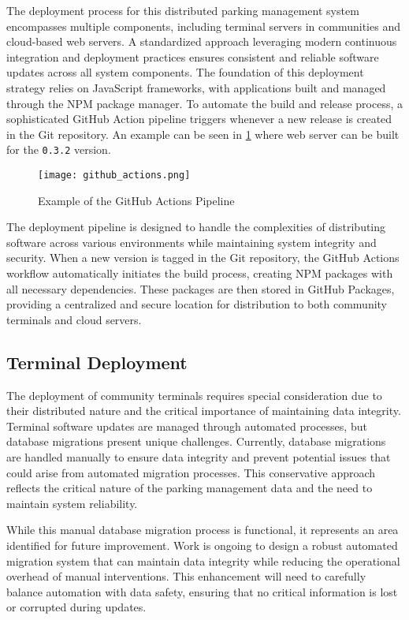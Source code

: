 The deployment process for this distributed parking management system encompasses multiple components, including terminal servers in communities and cloud-based web servers. A standardized approach leveraging modern continuous integration and deployment practices ensures consistent and reliable software updates across all system components. The foundation of this deployment strategy relies on JavaScript frameworks, with applications built and managed through the NPM package manager. To automate the build and release process, a sophisticated GitHub Action pipeline triggers whenever a new release is created in the Git repository. An example can be seen in \cref{fig:github_actions} where web server can be built for the \texttt{0.3.2} version.

\begin{figure}
	\texttt{[image: github\_actions.png]}
	\caption{Example of the GitHub Actions Pipeline}\label{fig:github_actions}
\end{figure}

The deployment pipeline is designed to handle the complexities of distributing software across various environments while maintaining system integrity and security. When a new version is tagged in the Git repository, the GitHub Actions workflow automatically initiates the build process, creating NPM packages with all necessary dependencies. These packages are then stored in GitHub Packages, providing a centralized and secure location for distribution to both community terminals and cloud servers.

\subsection{Terminal Deployment}

The deployment of community terminals requires special consideration due to their distributed nature and the critical importance of maintaining data integrity. Terminal software updates are managed through automated processes, but database migrations present unique challenges. Currently, database migrations are handled manually to ensure data integrity and prevent potential issues that could arise from automated migration processes. This conservative approach reflects the critical nature of the parking management data and the need to maintain system reliability.

While this manual database migration process is functional, it represents an area identified for future improvement. Work is ongoing to design a robust automated migration system that can maintain data integrity while reducing the operational overhead of manual interventions. This enhancement will need to carefully balance automation with data safety, ensuring that no critical information is lost or corrupted during updates.


